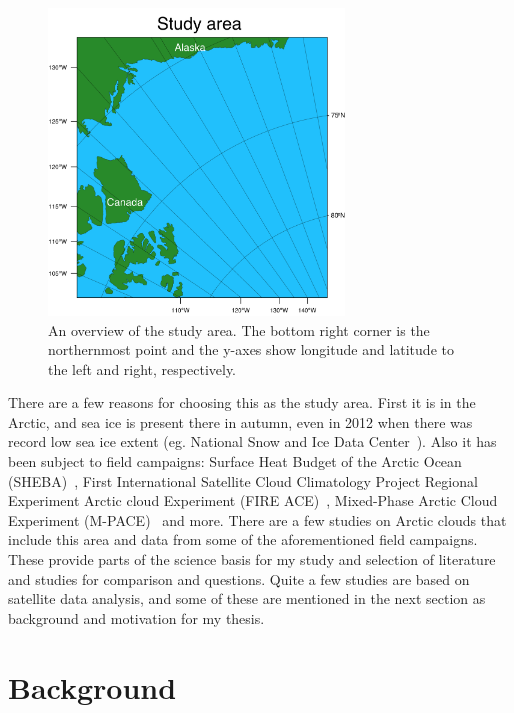 \begin{figure}
\centering
\includegraphics[width=0.7\textwidth]{introduction/studyarea.png}
\caption{An overview of the study area. The bottom right corner is the northernmost point and the y-axes show longitude and latitude to the left and right, respectively.}
\label{fig:area}
\end{figure}
 
There are a few reasons for choosing this as the study area. First it is in the Arctic, and sea ice is present there in autumn, even in 2012 when there was record low sea ice extent (eg. National Snow and Ice Data Center~\citep{NSIDC}). Also it has been subject to field campaigns: Surface Heat Budget of the Arctic Ocean (SHEBA)~\citep{Uttal2002}, First International Satellite Cloud Climatology Project Regional Experiment Arctic cloud Experiment (FIRE ACE)~\citep{Curry2000}, Mixed-Phase Arctic Cloud Experiment (M-PACE)~\citep{Verlinde2007} and more. There are a few studies on Arctic clouds that include this area and data from some of the aforementioned field campaigns. These provide parts of the science basis for my study and selection of literature and studies for comparison and questions. Quite a few studies are based on satellite data analysis, and some of these are mentioned in the next section as background and motivation for my thesis.

\section{Background}
\label{sec:background}


